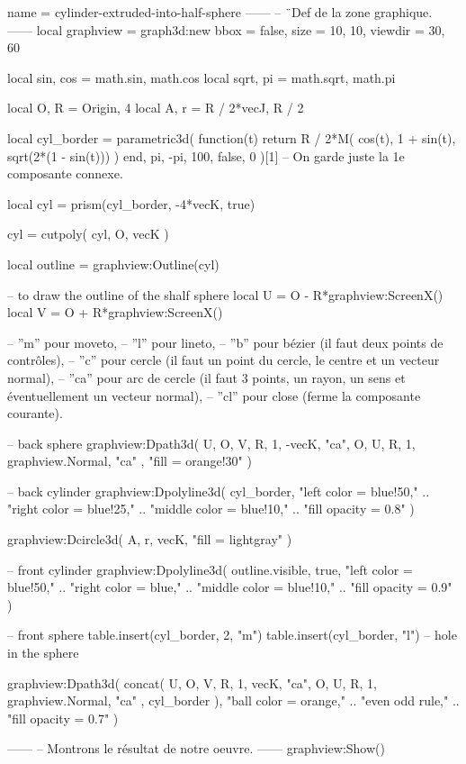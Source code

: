 \documentclass{standalone}
\begin{document}
\begin{luadraw}{name = cylinder-extruded-into-half-sphere}
------
-- ¨Def de la zone graphique.
------
local graphview = graph3d:new{
  bbox    = false,
  size    = {10, 10},
  viewdir = {30, 60}
}

local sin, cos = math.sin, math.cos
local sqrt, pi = math.sqrt, math.pi

local O, R = Origin, 4
local A, r = R / 2*vecJ, R / 2

local cyl_border = parametric3d(
  function(t)
    return R / 2*M(
      cos(t),
      1 + sin(t),
      sqrt(2*(1 - sin(t)))
    )
  end,
  pi, -pi, 100,
  false,
  0
)[1] -- On garde juste la 1e composante connexe.

local cyl = prism(cyl_border, -4*vecK, true)

cyl = cutpoly(
  cyl,
  {O, vecK}
)

local outline = graphview:Outline(cyl)

-- to draw the outline of the shalf sphere
local U = O - R*graphview:ScreenX()
local V = O + R*graphview:ScreenX()






-- ”m” pour moveto,
-- ”l” pour lineto,
-- ”b” pour bézier (il faut deux points de contrôles),
-- ”c” pour cercle (il faut un point du cercle, le centre et un vecteur normal),
-- ”ca” pour arc de cercle (il faut 3 points, un rayon, un sens et éventuellement un vecteur normal), -- ”cl” pour close (ferme la composante courante).


-- back sphere
graphview:Dpath3d(
  {
    U, O, V, R, 1, -vecK, "ca",
    O, U, R, 1, graphview.Normal, "ca"
  },
  "fill = orange!30"
)

-- back cylinder
graphview:Dpolyline3d(
  cyl_border,
     "left color = blue!50,"
  .. "right color = blue!25,"
  .. "middle color = blue!10,"
  .. "fill opacity = 0.8"
)

graphview:Dcircle3d(
  A, r, vecK,
  "fill = lightgray"
)

-- front cylinder
graphview:Dpolyline3d(
  outline.visible,
  true,
     "left color = blue!50,"
  .. "right color = blue,"
  .. "middle color = blue!10,"
  .. "fill opacity = 0.9"
)

-- front sphere
table.insert(cyl_border, 2, "m")
table.insert(cyl_border, "l") -- hole in the sphere

graphview:Dpath3d(
  concat(
    {
      U, O, V, R, 1, vecK, "ca",
      O, U, R, 1, graphview.Normal, "ca"
    },
    cyl_border
  ),
     "ball color = orange,"
  .. "even odd rule,"
  .. "fill opacity = 0.7"
)

------
-- Montrons le résultat de notre oeuvre.
------
graphview:Show()
\end{luadraw}
\end{document}

